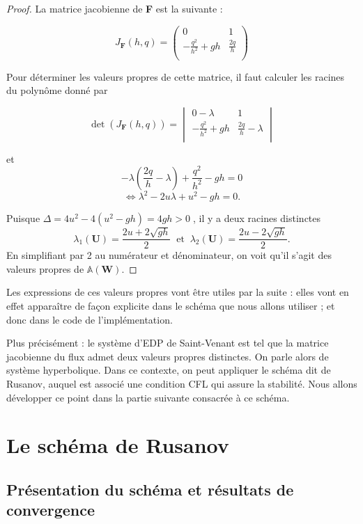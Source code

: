 \documentclass[
11pt, %
francais, %
singlespacing, %
headsepline, %
]{MastersDoctoralThesis} %
\begin{document}
\begin{proof}

La matrice jacobienne de \textbf{F} est la suivante :

$$J_{\textbf{F}}(h, q) =\begin{pmatrix}
   0 & 1  \\
   -\frac{q^{2}}{h^{2}}+gh & \frac{2q}{h}  \\
\end{pmatrix}$$

Pour déterminer les valeurs propres de cette matrice, il faut calculer les racines du polynôme donné par

$$\det (J_{\textbf{F}}(h, q)) =\begin{vmatrix}
   0-\lambda & 1  \\
   -\frac{q^{2}}{h^{2}}+gh & \frac{2q}{h}-\lambda  \\
\end{vmatrix}$$

et $$-\lambda(\frac{2q}{h}-\lambda)+\frac{q^{2}}{h^{2}}-gh=0$$
$$\Leftrightarrow \lambda^{2}-2u\lambda+u^{2}-gh=0.$$

Puisque $\Delta=4u^{2}-4(u^{2}-gh)=4gh>0\phantom{.}$, il y a deux racines distinctes 
$$\lambda_{1}(\textbf{U})=\frac{2u+2\sqrt{gh}}{2} \phantom{..}\text{et}\phantom{..} \lambda_{2}(\textbf{U})=\frac{2u-2\sqrt{gh}}{2}.$$
En simplifiant par 2 au numérateur et dénominateur, on voit qu'il s'agit des valeurs propres de  $\mathbb{A}(\textbf{W}).$

\end{proof}

Les expressions de ces valeurs propres vont être utiles par la suite : elles vont en effet apparaître de fa\c con explicite dans le schéma que nous allons utiliser ; et donc dans le code de l'implémentation.

Plus précisément : le système d'EDP de Saint-Venant est tel que la matrice jacobienne du flux admet deux valeurs propres distinctes. On parle alors de système hyperbolique.
Dans ce contexte, on peut appliquer le schéma dit de Rusanov, auquel est associé une condition CFL qui assure la stabilité. Nous allons développer ce point dans la partie suivante consacrée à ce schéma.

\section{Le schéma de Rusanov}

\subsection{Présentation du schéma et résultats de convergence}
\end{document}
